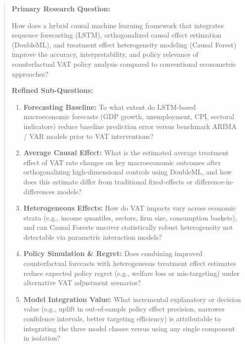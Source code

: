 \begin{quote}
\textbf{Primary Research Question:}

How does a hybrid causal machine learning framework that integrates sequence forecasting (LSTM), orthogonalized causal effect estimation (DoubleML), and treatment effect heterogeneity modeling (Causal Forest) improve the accuracy, interpretability, and policy relevance of counterfactual VAT policy analysis compared to conventional econometric approaches?

\textbf{Refined Sub-Questions:}

\begin{enumerate}
    \item \textbf{Forecasting Baseline:} To what extent do LSTM-based macroeconomic forecasts (GDP growth, unemployment, CPI, sectoral indicators) reduce baseline prediction error versus benchmark ARIMA / VAR models prior to VAT interventions?
    
    \item \textbf{Average Causal Effect:} What is the estimated average treatment effect of VAT rate changes on key macroeconomic outcomes after orthogonalizing high-dimensional controls using DoubleML, and how does this estimate differ from traditional fixed-effects or difference-in-differences models?
    
    \item \textbf{Heterogeneous Effects:} How do VAT impacts vary across economic strata (e.g., income quantiles, sectors, firm size, consumption baskets), and can Causal Forests uncover statistically robust heterogeneity not detectable via parametric interaction models?
    
    \item \textbf{Policy Simulation \& Regret:} Does combining improved counterfactual forecasts with heterogeneous treatment effect estimates reduce expected policy regret (e.g., welfare loss or mis-targeting) under alternative VAT adjustment scenarios?
    
    \item \textbf{Model Integration Value:} What incremental explanatory or decision value (e.g., uplift in out-of-sample policy effect precision, narrower confidence intervals, better targeting efficiency) is attributable to integrating the three model classes versus using any single component in isolation?

\end{enumerate}
\end{quote}




